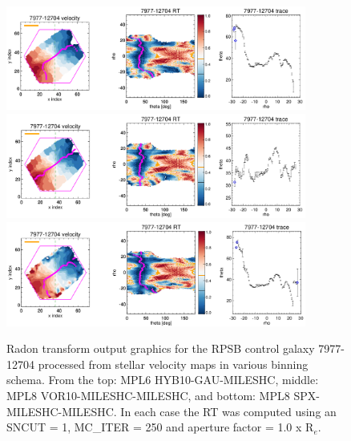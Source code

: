 \documentclass[fleqn,usenatbib]{mnras}
\begin{document}
\begin{figure}
    \centering
    \includegraphics[width=0.88\textwidth]{Images/bin-test/7977-12704-1-1-250-10-HYB10.png}
    \includegraphics[width=0.88\textwidth]{Images/bin-test/7977-12704-1-1-250-10-VOR10.png}
    \includegraphics[width=0.88\textwidth]{Images/bin-test/7977-12704-1-1-250-10-SPX.png}    
    \caption{Radon transform output graphics for the RPSB control galaxy 7977-12704 processed from stellar velocity maps in various binning schema. From the top: MPL6 HYB10-GAU-MILESHC, middle: MPL8 VOR10-MILESHC-MILESHC, and bottom: MPL8 SPX-MILESHC-MILESHC. In each case the RT was computed using an SNCUT = 1, MC\_ITER = 250 and aperture factor = 1.0 x R$_e$.}
    \label{fig:bin-test-1}
\end{figure}
\end{document}
